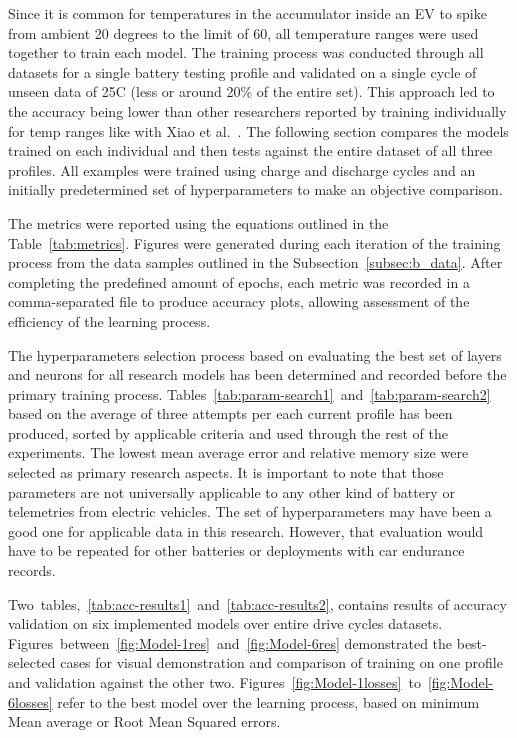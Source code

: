 Since it is common for temperatures in the accumulator inside an EV to spike from ambient 20 degrees to the limit of 60, all temperature ranges were used together to train each model.
The training process was conducted through all datasets for a single battery testing profile and validated on a single cycle of unseen data of 25\textdegree{}C (less or around 20\% of the entire set).
This approach led to the accuracy being lower than other researchers reported by training individually for temp ranges like with Xiao et al.~\cite{xiao_accurate_2019}.
The following section compares the models trained on each individual and then tests against the entire dataset of all three profiles.
All examples were trained using charge and discharge cycles and an initially predetermined set of hyperparameters to make an objective comparison.

%
%
The metrics were reported using the equations outlined in the \mbox{Table~\ref{tab:metrics}}.
Figures were generated during each iteration of the training process from the data samples outlined in the \mbox{Subsection~\ref{subsec:b_data}}.
After completing the predefined amount of epochs, each metric was recorded in a comma-separated file to produce accuracy plots, allowing assessment of the efficiency of the learning process.

%
The hyperparameters selection process based on evaluating the best set of layers and neurons for all research models has been determined and recorded before the primary training process.
\mbox{Tables~\ref{tab:param-search1} and~\ref{tab:param-search2}} based on the average of three attempts per each current profile has been produced, sorted by applicable criteria and used through the rest of the experiments.
The lowest mean average error and relative memory size were selected as primary research aspects.
It is important to note that those parameters are not universally applicable to any other kind of battery or telemetries from electric vehicles.
The set of hyperparameters may have been a good one for applicable data in this research.
However, that evaluation would have to be repeated for other batteries or deployments with car endurance records.

%
%
\mbox{Two tables, \ref{tab:acc-results1} and \ref{tab:acc-results2}}, contains results of accuracy validation on six implemented models over entire drive cycles datasets.
\mbox{Figures between \ref{fig:Model-1res} and \ref{fig:Model-6res}} demonstrated the best-selected cases for visual demonstration and comparison of training on one profile and validation against the other two.
\mbox{Figures \ref{fig:Model-1losses} to \ref{fig:Model-6losses}} refer to the best model over the learning process, based on minimum Mean average or Root Mean Squared errors.


